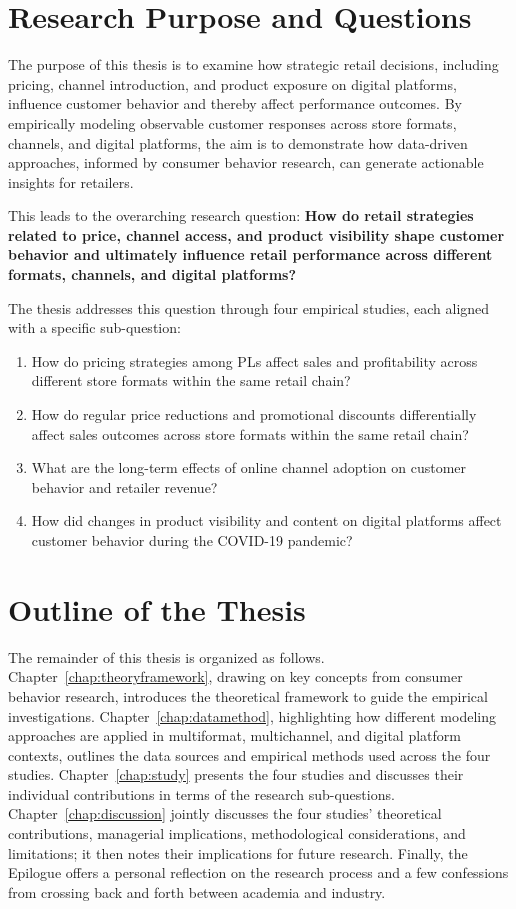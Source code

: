 \section{Research Purpose and Questions}
The purpose of this thesis is to examine how strategic retail decisions, including pricing, channel introduction, and product exposure on digital platforms, influence customer behavior and thereby affect performance outcomes. By empirically modeling observable customer responses across store formats, channels, and digital platforms, the aim is to demonstrate how data-driven approaches, informed by consumer behavior research, can generate actionable insights for retailers.

This leads to the overarching research question: \textbf{How do retail strategies related to price, channel access, and product visibility shape customer behavior and ultimately influence retail performance across different formats, channels, and digital platforms?}

The thesis addresses this question through four empirical studies, each aligned with a specific sub-question:
\begin{enumerate}
    \item How do pricing strategies among PLs affect sales and profitability across different store formats within the same retail chain?
    \item How do regular price reductions and promotional discounts differentially affect sales outcomes across store formats within the same retail chain?
    \item What are the long-term effects of online channel adoption on customer behavior and retailer revenue?
    \item How did changes in product visibility and content on digital platforms affect customer behavior during the COVID-19 pandemic?
\end{enumerate}

\section{Outline of the Thesis}
The remainder of this thesis is organized as follows. Chapter~\ref{chap:theoryframework}, drawing on key concepts from consumer behavior research, introduces the theoretical framework to guide the empirical investigations. Chapter~\ref{chap:datamethod}, highlighting how different modeling approaches are applied in multiformat, multichannel, and digital platform contexts, outlines the data sources and empirical methods used across the four studies. Chapter~\ref{chap:study} presents the four studies and discusses their individual contributions in terms of the research sub-questions. Chapter~\ref{chap:discussion} jointly discusses the four studies’ theoretical contributions, managerial implications, methodological considerations, and limitations; it then notes their implications for future research. Finally, the Epilogue offers a personal reflection on the research process and a few confessions from crossing back and forth between academia and industry.